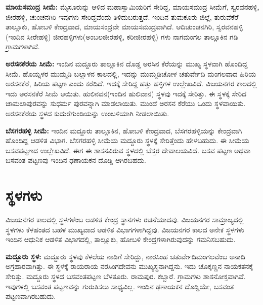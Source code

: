 \textbf{ಮಾಯಸಮುದ್ರ ಸೀಮೆ:} ಮೈಸೂರುನ್ನು ಆಳಿದ ಮಹಾಸ್ವಾಮಿಯರಿಗೆ ಸೇರಿದ್ದ, ಮಾಯಸಮುದ್ರ ಸೀಮೆಗೆ, ಸ್ವರವನಹಳ್ಳಿ, ಜೀರಹಳ್ಳಿ, ಚುಂಚನಗಿರಿ ಇವುಗಳು ಸೇರಿದ್ದವೆಂದು ತಿಳಿದುಬರುತ್ತದೆ. ಇಂದಿನ ತುಮಕೂರು ಜಿಲ್ಲೆ, ತುರುವೆಕೆರೆ ತಾಲ್ಲೂಕು, ಹೋಬಳಿ ಕೇಂದ್ರವಾದ, ಮಾಯಸಂದ್ರವೇ ಮಾಯಸಮುದ್ರವಾಗಿದೆ. ಆದಿಚುಂಚನಗಿರಿ, ಸ್ವರವನಹಳ್ಳಿ (ಇಂದಿನ ಸೀರೇಹಳ್ಳಿ) ಜೀರಹಳ್ಳಿಗಳು(ಅಂಬಲಜೀರಹಳ್ಳಿ, ಕರೀಜೀರಹಳ್ಳಿ) ಗಳು ನಾಗಮಂಗಲ ತಾಲ್ಲೂಕಿನ ಗಡಿ ಗ್ರಾಮಗಳಾಗಿವೆ.

\vskip -1pt

\textbf{ಅರಸನಕೆರೆಯ ಸೀಮೆ:} ಇಂದಿನ ಮದ್ದೂರು ತಾಲ್ಲೂಕಿನ ದೊಡ್ಡ ಅರಸಿನ ಕೆರೆಯನ್ನು ಮುಖ್ಯ ಸ್ಥಳವಾಗಿ ಹೊಂದಿದ್ದ ಸೀಮೆ. ಹೊಯ್ಸಳರ ಮುಮ್ಮಡಿ ಬಲ್ಲಾಳನ ಕಾಲದಲ್ಲಿ, ಇದನ್ನು ಮುಮ್ಮಡಿಚೋಳ ಚತುರ್ವೇದಿ ಮಂಗಲವಾದ ಹಿರಿಯ ಅರಸನಕೆರೆ, ಹಿರಿಯ ಪಟ್ಟಣ ಎಂದು ಕರೆದಿದೆ. ಇದಕ್ಕೆ ಸೇರಿದ್ದ ಹತ್ತು ಹಳ್ಳಿಗಳ ಉಲ್ಲೇಖವಿದೆ. ವಿಜಯನಗರ ಕಾಲದಲ್ಲಿ ಇದು ಅರಸನಕೆರೆ ಸೀಮೆ ಆಯಿತು. ಹುಲಿನವನ(ಇಂದಿನ ಹುಲಿವಾನ) ಸ್ಥಳವು ಇದಕ್ಕೆ ಸೇರಿತ್ತು. ಈ ಸ್ಥಳಕ್ಕೆ ಸೇರಿದ ಚಾಮಲಾಪುರವನ್ನು ಸುಧರ್ಮ ಪುರವನ್ನಾಗಿ ಮಾಡಲಾಯಿತು. ಮುಂದೆ ಅರಸನ ಕೆರೆಯು ಒಂದು ಸ್ಥಳವಾಯಿತು. ಅರಸನಕೆರೆಯ ಸ್ಥಳದ ಕುದುರೆಗುಂಡಿಯನ್ನು ಉಂಬಳಿಯಾಗಿ ನೀಡಲಾಯಿತು.

\vskip -1pt

\textbf{ಬೆಸಗರಹಳ್ಳಿ ಸೀಮೆ:} ಇಂದಿನ ಮದ್ದೂರು ತಾಲ್ಲೂಕಿನ, ಹೋಬಳಿ ಕೇಂದ್ರವಾದ, ಬೆಸಗರಹಳ್ಳಿಯನ್ನು ಕೇಂದ್ರವಾಗಿ ಹೊಂದಿದ್ದ ಆಡಳಿತ ವಿಭಾಗ. ಬೆಸಗರಹಳ್ಳಿ ಸೀಮೆಯ ಮದ್ದೂರು ಸ್ಥಳಕ್ಕೆ ಸೇರಿತ್ತೆಂದು ಹೇಳಬಹುದು. ಈ ಸೀಮೆಯ ಬಸವಪಟ್ಟಣದ ಉಲ್ಲೇಖವಿದೆ. ಈಗ ಈ ಶಾಸನವಿರುವ ಸ್ಥಳದಲ್ಲಿ ಬೆಸ್ತರ ದೇವಾಲಯವಿದೆ. ಬಸವ ಪಟ್ಟಣ ಅಥವಾ ಬಸವಂತ ಪಟ್ಟಣವು ಇಂದಿನ ಢಣಾಯಕನ ದೊಡ್ಡಿ ಆಗಿರಬಹದು.


\section{ಸ್ಥಳಗಳು}

ವಿಜಯನಗರ ಕಾಲದಲ್ಲಿ ಸ್ಥಳಗಳೆಂಬ ಆಡಳಿತ ಕೇಂದ್ರ ಸ್ಥಾನಗಳು ರಚನೆಯಾದವು. ವಿಜಯನಗರ ಸಾಮ್ರಾಜ್ಯದಲ್ಲಿ ಸ್ಥಳಗಳು ಕೆಳಹಂತದ ಬಹಳ ಮುಖ್ಯವಾದ ಆಡಳಿತ ವಿಭಾಗಗಳಾಗಿದ್ದವು. ವಿಜಯನಗರ ಕಾಲದ ಅನೇಕ ಸ್ಥಳಗಳು ಇಂದಿನ ಆಧುನಿಕ ಆಡಳಿತ ವಿಭಾಗದಲ್ಲಿ, ತಾಲ್ಲೂಕು, ಹೋಬಳಿ ಕೇಂದ್ರಗಳಾಗಿರುವುದನ್ನು ಗಮನಿಸಬಹುದು.

\vskip -1pt

\textbf{ಮದ್ದೂರು ಸ್ಥಳ:} ಮದ್ದೂರು ಸ್ಥಳವು ಕೆಳಲೆಯ ನಾಡಿಗೆ ಸೇರಿದ್ದು, ನಾರಸಿಂಹ ಚತುರ್ವೇದಿಮಂಗಲವೆಂಬ ಅನಾದಿ ಅಗ್ರಹಾರವಾಗಿತ್ತು. ಈ ಸ್ಥಳಕ್ಕೆ ರಾಯರಾಯ ನರಸಿಂಗದೇವನು ಮುಖ್ಯಸ್ಥನಾಗಿದ್ದನು. ಇದು ಚೊಕ್ಕಣ್ಣನ ನಾಯಕತನಕ್ಕೆ ಸೇರಿತ್ತು. ಮದ್ದೂರು ಸ್ಥಳದ ಬಸವಂತಪಟ್ಟಣ ಬೆಳತೂರು. ರಾಮಪುರ. ಕಬ್ಬಾರೆ. ಗ್ರಾಮಗಳು ಶಾಸನೋಕ್ತವಾಗಿವೆ. ಇವುಗಳಲ್ಲಿ ಬಸವಂತ ಪಟ್ಟಣವನ್ನು ಗುರುತಿಸಲು ಸಾಧ್ಯವಿಲ್ಲ. ಇಂದಿನ ಢಣಾಯಕನ ದೊಡ್ಡಿಯೇ, ಬಸವಂತ ಪಟ್ಟಣವಾಗಿರಬಹುದು.

